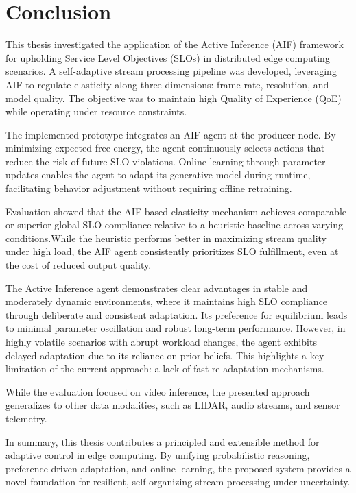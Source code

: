 \chapter{Conclusion}
\label{chap:conclusion}
This thesis investigated the application of the Active Inference (AIF) framework for upholding Service Level Objectives (SLOs) in distributed edge computing scenarios. A self-adaptive stream processing pipeline was developed, leveraging AIF to regulate elasticity along three dimensions: frame rate, resolution, and model quality. The objective was to maintain high Quality of Experience (QoE) while operating under resource constraints.

The implemented prototype integrates an AIF agent at the producer node. By minimizing expected free energy, the agent continuously selects actions that reduce the risk of future SLO violations. Online learning through parameter updates enables the agent to adapt its generative model during runtime, facilitating behavior adjustment without requiring offline retraining.

Evaluation showed that the AIF-based elasticity mechanism achieves comparable or superior global SLO compliance relative to a heuristic baseline across varying conditions.While the heuristic performs better in maximizing stream quality under high load, the AIF agent consistently prioritizes SLO fulfillment, even at the cost of reduced output quality.

The Active Inference agent demonstrates clear advantages in stable and moderately dynamic environments, where it maintains high SLO compliance through deliberate and consistent adaptation. Its preference for equilibrium leads to minimal parameter oscillation and robust long-term performance. However, in highly volatile scenarios with abrupt workload changes, the agent exhibits delayed adaptation due to its reliance on prior beliefs. This highlights a key limitation of the current approach: a lack of fast re-adaptation mechanisms.

While the evaluation focused on video inference, the presented approach generalizes to other data modalities, such as LIDAR, audio streams, and sensor telemetry. 

In summary, this thesis contributes a principled and extensible method for adaptive control in edge computing. By unifying probabilistic reasoning, preference-driven adaptation, and online learning, the proposed system provides a novel foundation for resilient, self-organizing stream processing under uncertainty.
